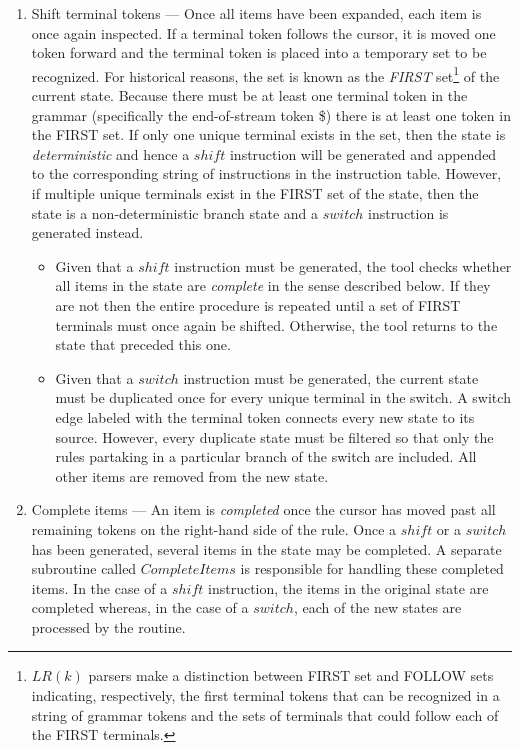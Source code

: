 \documentclass[a4paper,11pt]{article}
\begin{document}
\begin{enumerate}
\item Shift terminal tokens --- Once all items have been expanded, each item is once again inspected. 
If a terminal token follows the cursor, it is moved one token forward and the terminal token is placed into a temporary set to be recognized.
For historical reasons, the set is known as the \emph{FIRST} set\footnote{$LR(k)$ parsers make a distinction between FIRST set and FOLLOW sets indicating, respectively, 
the first terminal tokens that can be recognized in a string of grammar tokens and the sets of terminals that could follow each of the FIRST terminals.} of the current state.
Because there must be at least one terminal token in the grammar (specifically the end-of-stream token \$) there is at least one token in the FIRST set.
If only one unique terminal exists in the set, then the state is \emph{deterministic} and hence a $shi\!ft$ instruction will be generated and appended to the corresponding string of instructions in the instruction table.
However, if multiple unique terminals exist in the FIRST set of the state, then the state is a non-deterministic branch state and a $switch$ instruction is generated instead.
\begin{itemize}
\item Given that a $shi\!ft$ instruction must be generated, the tool checks whether all items in the state are \emph{complete} in the sense described below. 
If they are not then the entire procedure is repeated until a set of FIRST terminals must once again be shifted. 
Otherwise, the tool returns to the state that preceded this one.
\item Given that a $switch$ instruction must be generated, the current state must be duplicated once for every unique terminal in the switch. 
A switch edge labeled with the terminal token connects every new state to its source.
However, every duplicate state must be filtered so that only the rules partaking in a particular branch of the switch are included.
All other items are removed from the new state. %
\end{itemize}

\item Complete items --- An item is \emph{completed} once the cursor has moved past all remaining tokens on the right-hand side of the rule.
Once a $shi\!ft$ or a $switch$ has been generated, several items in the state may be completed. 
A separate subroutine called $CompleteItems$ is responsible for handling these completed items.
In the case of a $shi\!ft$ instruction, the items in the original state are completed whereas, in the case of a $switch$, each of the new states are processed by the routine.\\


\end{enumerate}
\end{document}
